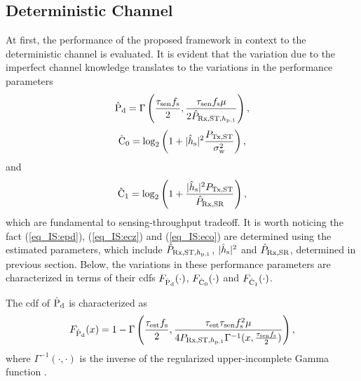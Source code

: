 \subsection{Deterministic Channel} \label{ssec_IS:det_th}
At first, the performance of the proposed framework in context to the deterministic channel is evaluated.
It is evident that the variation due to the imperfect channel knowledge translates to the variations in the performance parameters 
\begin{align}
\hat{\text{P}}_{\text{d}} = \Gamma\left( \frac{\tau_{\text{sen}} f_{\text{s}}}{2}, \frac{\tau_{\text{sen}} f_{\text{s}} \mu}{2 \hat{P}_{\text{Rx,ST,$h_{\text{p,1}}$}}} \right),  \label{eq_IS:epd} 
\end{align}
\begin{align}
\hat{\text{C}}_{\text{0}} = \log_2 \left(1 + |\hat{h}_{\text{s}}|^2 \frac{P_{\text{Tx,ST}}}{\sigma^2_{\text{w}}}\right), 
\label{eq_IS:ecz} 
\end{align}
and 
\begin{align}
\hat{\text{C}}_{\text{1}} = \log_2 \left(1 + \frac{|\hat{h}_{\text{s}}|^2 P_{\text{Tx,ST}} }{\hat{P}_{\text{Rx,SR}}} \right), 
\label{eq_IS:eco} 
\end{align}
which are fundamental to sensing-throughput tradeoff. It is worth noticing the fact (\ref{eq_IS:epd}), (\ref{eq_IS:ecz}) and (\ref{eq_IS:eco}) are determined using the estimated parameters, which include $\hat{P}_{\text{Rx,ST,$h_{\text{p,1}}$}}$, $|\hat{h}_{\text{s}}|^2$ and $\hat{P}_{\text{Rx,SR}}$, determined in previous section. Below, the variations in these performance parameters are characterized in terms of their cdfs $F_{\hat{\text{P}}_{\text{d}}}(\cdot)$, $F_{\hat{\text{C}}_{\text{0}}}(\cdot)$ and $F_{\hat{\text{C}}_{\text{1}}}(\cdot)$.  
\begin{lemma} \label{lm_IS:lem1}
\normalfont
The cdf of $\hat{\text{P}}_{\text{d}}$ is characterized as 
\begin{align}
F_{\hat{\text{P}}_{\text{d}}}(x) = 1 - \Gamma \left(\frac{\tau_{\text{est}} f_{\text{s}}}{2}, \frac{\tau_{\text{est}} \tau_{\text{sen}} f_{\text{s}}^2 \mu}{4 P_{\text{Rx,ST,$h_{\text{p,1}}$}} \Gamma^{-1}(x, \frac{\tau_{\text{sen}} f_{\text{s}}}{2}) } \right), 
\label{eq_IS:fpd}
\end{align}
where $\Gamma^{-1}(\cdot, \cdot)$ is the inverse of the regularized upper-incomplete Gamma function \cite{grad}.  
\end{lemma} 
